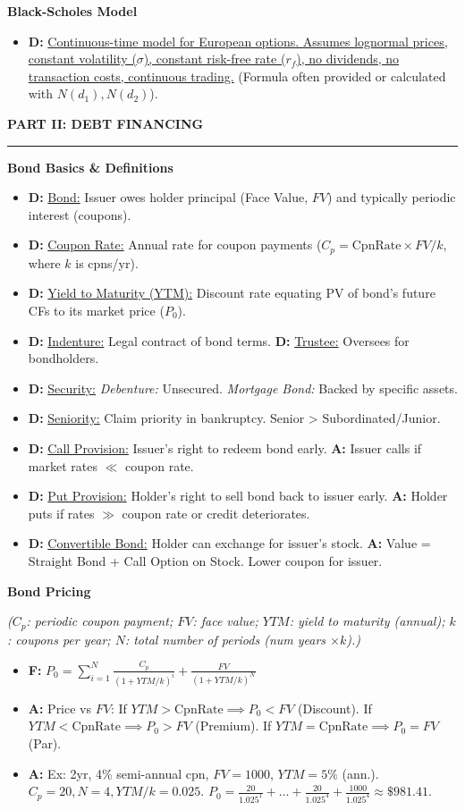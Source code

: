 \documentclass[7pt,landscape]{extarticle} %
\newcommand{\cheatsheetsection}[1]{%
  \vspace{0.25ex plus 0.1ex minus 0.05ex}%
  \noindent\color{SecTitleColor}\textbf{\sffamily\small\MakeUppercase{#1}}%
  \par\vspace{0.02ex}%
  {\color{RuleColor}\hrule height 0.3pt}\par\vspace{0.15ex}%
}
\newcommand{\cheatsheetsubsubsection}[1]{%
  \vspace{0.15ex plus 0.05ex minus 0.05ex}%
  \noindent\textbf{\sffamily\scriptsize #1}%
  \par\vspace{0.05ex}%
}
\newcommand{\D}[1]{\textbf{\textcolor{DefColor}{D:}} \uline{#1}}
\newcommand{\F}[1]{\textbf{\textcolor{FormColor}{F:}} #1}
\newcommand{\A}[1]{\textbf{\textcolor{AppColor}{A:}} #1}
\newcommand{\SF}[1]{\textit{\small (#1)}} %
\begin{document}
\begin{multicols*}{4}
  \cheatsheetsubsubsection{Black-Scholes Model}
  \begin{itemize}
    \item \D{Continuous-time model for European options. Assumes lognormal prices, constant volatility ($\sigma$), constant risk-free rate ($r_f$), no dividends, no transaction costs, continuous trading.} (Formula often provided or calculated with $N(d_1), N(d_2)$).
  \end{itemize}

  \cheatsheetsection{Part II: Debt Financing}
  
  \cheatsheetsubsubsection{Bond Basics \& Definitions}
  \begin{itemize}
    \item \D{Bond:} Issuer owes holder principal (Face Value, $FV$) and typically periodic interest (coupons).
    \item \D{Coupon Rate:} Annual rate for coupon payments ($C_p = \text{CpnRate} \times FV / k$, where $k$ is cpns/yr).
    \item \D{Yield to Maturity (YTM):} Discount rate equating PV of bond's future CFs to its market price ($P_0$).
    \item \D{Indenture:} Legal contract of bond terms. \D{Trustee:} Oversees for bondholders.
    \item \D{Security:} \emph{Debenture:} Unsecured. \emph{Mortgage Bond:} Backed by specific assets.
    \item \D{Seniority:} Claim priority in bankruptcy. Senior > Subordinated/Junior.
    \item \D{Call Provision:} Issuer's right to redeem bond early. \A{Issuer calls if market rates $\ll$ coupon rate.}
    \item \D{Put Provision:} Holder's right to sell bond back to issuer early. \A{Holder puts if rates $\gg$ coupon rate or credit deteriorates.}
    \item \D{Convertible Bond:} Holder can exchange for issuer's stock. \A{Value = Straight Bond + Call Option on Stock. Lower coupon for issuer.}
  \end{itemize}
  
  \cheatsheetsubsubsection{Bond Pricing}
  \SF{$C_p$: periodic coupon payment; $FV$: face value; $YTM$: yield to maturity (annual); $k$: coupons per year; $N$: total number of periods (num years $\times k$).}
  \begin{itemize}
    \item \F{$P_0 = \sum_{i=1}^{N} \frac{C_p}{(1+YTM/k)^i} + \frac{FV}{(1+YTM/k)^N}$}
    \item \A{Price vs $FV$: If $YTM > \text{CpnRate} \implies P_0 < FV$ (Discount). If $YTM < \text{CpnRate} \implies P_0 > FV$ (Premium). If $YTM = \text{CpnRate} \implies P_0 = FV$ (Par).}
    \item \A{Ex: 2yr, 4\% semi-annual cpn, $FV=1000$, $YTM=5\%$ (ann.). $C_p=20, N=4, YTM/k=0.025$. $P_0 = \frac{20}{1.025^1} + \dots + \frac{20}{1.025^4} + \frac{1000}{1.025^4} \approx \$981.41$.}
  \end{itemize}
  

\end{multicols*}
\end{document}
